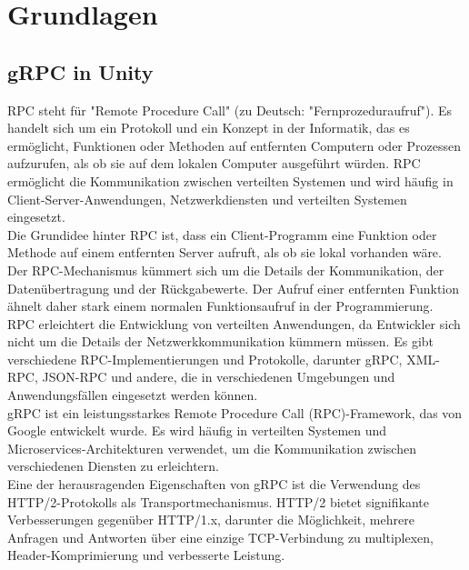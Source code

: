 \chapter{Grundlagen}
\section{gRPC in Unity}
RPC steht für "Remote Procedure Call" (zu Deutsch: "Fernprozeduraufruf"). Es handelt sich um ein Protokoll und ein Konzept in der Informatik, das es ermöglicht, Funktionen oder Methoden auf entfernten Computern oder Prozessen aufzurufen, als ob sie auf dem lokalen Computer ausgeführt würden. RPC ermöglicht die Kommunikation zwischen verteilten Systemen und wird häufig in Client-Server-Anwendungen, Netzwerkdiensten und verteilten Systemen eingesetzt.\cite{Bengel.2004}\\

Die Grundidee hinter RPC ist, dass ein Client-Programm eine Funktion oder Methode auf einem entfernten Server aufruft, als ob sie lokal vorhanden wäre. Der RPC-Mechanismus kümmert sich um die Details der Kommunikation, der Datenübertragung und der Rückgabewerte. Der Aufruf einer entfernten Funktion ähnelt daher stark einem normalen Funktionsaufruf in der Programmierung.\cite{Bengel.2004}\\

RPC erleichtert die Entwicklung von verteilten Anwendungen, da Entwickler sich nicht um die Details der Netzwerkkommunikation kümmern müssen. Es gibt verschiedene RPC-Implementierungen und Protokolle, darunter gRPC, XML-RPC, JSON-RPC und andere, die in verschiedenen Umgebungen und Anwendungsfällen eingesetzt werden können.\cite{Bengel.2004}\\


gRPC ist ein leistungsstarkes Remote Procedure Call (RPC)-Framework, das von Google entwickelt wurde. Es wird häufig in verteilten Systemen und Microservices-Architekturen verwendet, um die Kommunikation zwischen verschiedenen Diensten zu erleichtern.\\

Eine der herausragenden Eigenschaften von gRPC ist die Verwendung des HTTP/2-Protokolls als Transportmechanismus. HTTP/2 bietet signifikante Verbesserungen gegenüber HTTP/1.x, darunter die Möglichkeit, mehrere Anfragen und Antworten über eine einzige TCP-Verbindung zu multiplexen, Header-Komprimierung und verbesserte Leistung.\\

